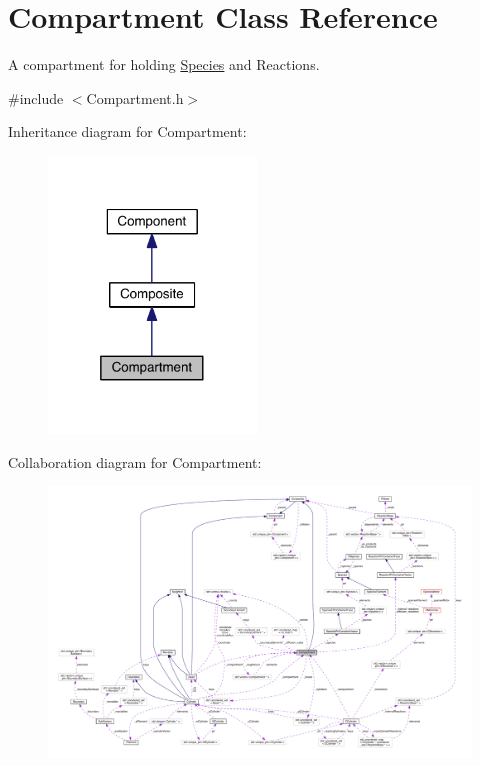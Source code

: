 \hypertarget{classCompartment}{\section{Compartment Class Reference}
\label{classCompartment}
}


A compartment for holding \hyperlink{classSpecies}{Species} and Reactions.  




{\ttfamily \#include $<$Compartment.\+h$>$}



Inheritance diagram for Compartment\+:\nopagebreak
\begin{figure}[H]
\begin{center}
\leavevmode
\includegraphics[width=157pt]{classCompartment__inherit__graph}
\end{center}
\end{figure}


Collaboration diagram for Compartment\+:\nopagebreak
\begin{figure}[H]
\begin{center}
\leavevmode
\includegraphics[width=350pt]{classCompartment__coll__graph}
\end{center}
\end{figure}
